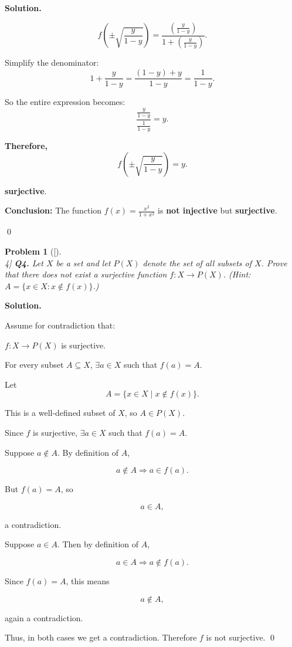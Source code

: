 \documentclass[12pt]{article}
\newtheorem{problemx}{Problem}
\newenvironment{problem}[1]{%
	\begin{problemx}[#1]\leavevmode\\[0.5em] %
	}{%
	\end{problemx}
}
\newenvironment{solution}{%
	\par\medskip
	\noindent\textbf{Solution.}\par\nopagebreak
}{%
	\hfill \qed \par\medskip
}
\begin{document}
\begin{solution}
 \[
 f\left(\pm\sqrt{\frac{y}{1 - y}}\right)
 = \frac{\left(\frac{y}{1 - y}\right)}{1 + \left(\frac{y}{1 - y}\right)}.
 \]
 
 Simplify the denominator:
 \[
 1 + \frac{y}{1 - y} = \frac{(1 - y) + y}{1 - y} = \frac{1}{1 - y}.
 \]
 
 So the entire expression becomes:
 \[
 \frac{\frac{y}{1 - y}}{\frac{1}{1 - y}} = y.
 \]
 
 \noindent\textbf{Therefore,}
 \[
 f\left(\pm\sqrt{\frac{y}{1 - y}}\right) = y.
 \]


 \textbf{surjective}.

\medskip

\noindent\textbf{Conclusion:} The function \( f(x) = \frac{x^2}{1 + x^2} \) is \textbf{not injective} but \textbf{surjective}.

		
		
	\end{solution}
	
	\begin{problem}[4]
		\textbf{Q4.} Let $X$ be a set and let $P(X)$ denote the set of all subsets of $X$. Prove that there does not exist a surjective function $f: X \to P(X)$. (Hint: $A = \{ x \in X : x \notin f(x) \}$.)
	\end{problem}
	
	\begin{solution}
		Assume for contradiction that:
		
		$f: X \to P(X)$ is surjective.
		
		For every subset $A \subseteq X$, $\exists a \in X$ such that $f(a) = A$.
		
		Let 
		$$A = \{ x \in X \mid x \notin f(x) \}.$$
		
		This is a well-defined subset of $X$, so $A \in P(X)$.
		
		Since $f$ is surjective, $\exists a \in X$ such that $f(a) = A$.
		
		Suppose $a \notin A$. By definition of $A$,
		
		$$a \notin A \Rightarrow a \in f(a).$$
		
		But $f(a) = A$, so 
		
		$$a \in A,$$
		
		a contradiction.
		
		Suppose $a \in A$. Then by definition of $A$,
		
		$$a \in A \Rightarrow a \notin f(a).$$
		
		Since $f(a) = A$, this means 
		
		$$a \notin A,$$
		
		again a contradiction.
		
		Thus, in both cases we get a contradiction. Therefore $f$ is not surjective.
	\end{solution}
	
\end{document}

